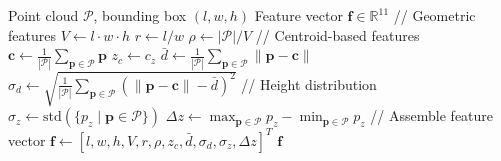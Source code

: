 \begin{algorithm}[H]
\caption{Vehicle Feature Extraction}
\label{alg:feature_extraction}
\begin{algorithmic}[1]
\REQUIRE Point cloud $\mathcal{P}$, bounding box $(l, w, h)$
\ENSURE Feature vector $\mathbf{f} \in \mathbb{R}^{11}$
\STATE // Geometric features
\STATE $V \leftarrow l \cdot w \cdot h$ 
\STATE $r \leftarrow l / w$ 
\STATE $\rho \leftarrow |\mathcal{P}| / V$ 
\STATE // Centroid-based features
\STATE $\mathbf{c} \leftarrow \frac{1}{|\mathcal{P}|} \sum_{\mathbf{p} \in \mathcal{P}} \mathbf{p}$
\STATE $z_c \leftarrow c_z$ 
\STATE $\bar{d} \leftarrow \frac{1}{|\mathcal{P}|} \sum_{\mathbf{p} \in \mathcal{P}} \|\mathbf{p} - \mathbf{c}\|$
\STATE $\sigma_d \leftarrow \sqrt{\frac{1}{|\mathcal{P}|} \sum_{\mathbf{p} \in \mathcal{P}} (\|\mathbf{p} - \mathbf{c}\| - \bar{d})^2}$
\STATE // Height distribution
\STATE $\sigma_z \leftarrow \text{std}(\{p_z \mid \mathbf{p} \in \mathcal{P}\})$
\STATE $\Delta z \leftarrow \max_{\mathbf{p} \in \mathcal{P}} p_z - \min_{\mathbf{p} \in \mathcal{P}} p_z$
\STATE // Assemble feature vector
\STATE $\mathbf{f} \leftarrow [l, w, h, V, r, \rho, z_c, \bar{d}, \sigma_d, \sigma_z, \Delta z]^T$
\RETURN $\mathbf{f}$
\end{algorithmic}
\end{algorithm}
